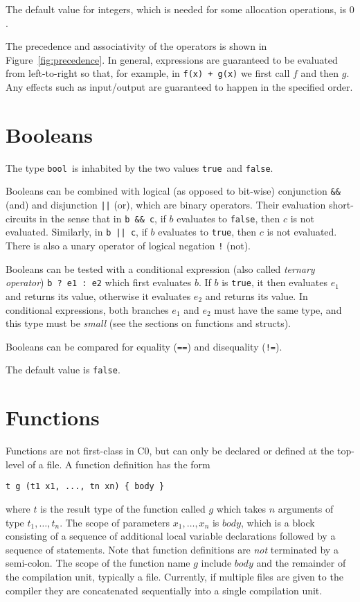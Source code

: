 \documentclass[11pt]{article}
\newcommand{\tbool}{\texttt{bool}}
\newcommand{\vtrue}{\texttt{true}}
\newcommand{\vfalse}{\texttt{false}}
\begin{document}
The default value for integers, which is needed for some allocation
operations, is $0$.

The precedence and associativity of the operators is shown
in Figure~\ref{fig:precedence}.  In general, expressions are
guaranteed to be evaluated from left-to-right so that, for example,
in \lstinline'f(x) + g(x)' we first call $f$ and then $g$.  Any effects
such as input/output are guaranteed to happen in the specified
order.

\section{Booleans}

The type \tbool\ is inhabited by the two values \vtrue\ and \vfalse.

Booleans can be combined with logical (as opposed to bit-wise)
conjunction \lstinline'&&' (and) and disjunction \lstinline'||' (or), which are
binary operators.  Their evaluation short-circuits in the sense that
in \lstinline'b && c', if $b$ evaluates to \vfalse, then $c$ is not
evaluated.  Similarly, in \lstinline'b || c', if $b$ evaluates to \vtrue,
then $c$ is not evaluated.  There is also a unary operator of logical
negation \lstinline'!' (not).

Booleans can be tested with a conditional expression (also
called \emph{ternary operator}) \lstinline'b ? e1 : e2'
which first evaluates $b$.  If $b$ is \vtrue, it then evaluates
$e_1$ and returns its value, otherwise it evaluates $e_2$
and returns its value.  In conditional expressions, both
branches $e_1$ and $e_2$ must have the same type, and this type
must be \emph{small} (see the sections on functions and
structs).

Booleans can be compared for equality (\lstinline'==') and disequality
(\lstinline'!=').

The default value is \vfalse.

\section{Functions}

Functions are not first-class in C0, but can only be declared
or defined at the top-level of a file.  A function definition
has the form
\begin{lstlisting}
t g (t1 x1, ..., tn xn) { body }
\end{lstlisting}
where $t$ is the result type of the function called $g$ which takes
$n$ arguments of type $t_1, \ldots, t_n$.  The scope of parameters
$x_1, \ldots, x_n$ is $\mathit{body}$, which is a block consisting of
a sequence of additional local variable declarations followed by a
sequence of statements.  Note that function definitions are \emph{not}
terminated by a semi-colon.  The scope of the function name $g$
include $\mathit{body}$ and the remainder of the compilation unit,
typically a file.  Currently, if multiple files are given to
the compiler they are concatenated sequentially into a single
compilation unit.
\end{document}
